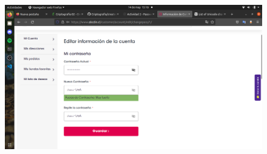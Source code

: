 \documentclass{article}
\begin{document}
\begin{figure}[h!]
    \centering
    \includegraphics[width=15cm]{superscriptscl.png}
\end{figure}
\end{document}
